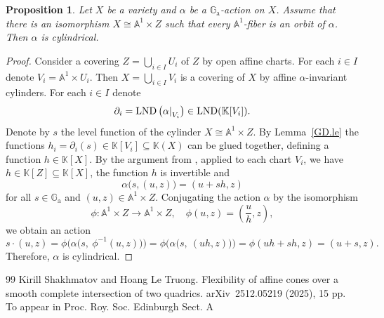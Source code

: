 \documentclass[10pt,a4paper]{amsart}
\newtheorem{prop}{Proposition}
\newcommand{\Ga}{\bb{G}_\mathrm{a}}
\DeclareMathOperator{\LND}{LND}
\newcommand{\bb}{\mathbb}
\newcommand{\der}{\partial}
\newcommand{\restrict}[2]{
    \left.
    \kern-\nulldelimiterspace{#1}
    \right|_{#2}
}
\begin{document}
\begin{prop} \label{CGA.pr}
Let $X$ be a variety and $\alpha$ be a $\Ga$-action on $X$. Assume that there is an isomorphism $X \cong \bb{A}^1 \times Z$ such that every $\bb{A}^1$-fiber is an orbit of $\alpha$. Then $\alpha$ is cylindrical.
\end{prop}

\begin{proof}
Consider a covering $Z = \bigcup_{i \in I} U_i$ of $Z$ by open affine charts. For each $i \in I$ denote $V_i = \bb{A}^1 \times U_i$. Then $X = \bigcup_{i \in I} V_i$ is a covering of $X$ by affine $\alpha$-invariant cylinders. For each $i \in I$ denote
$$
\der_i =
\LND \left( \restrict{\alpha}{V_i} \right) \in
\LND(\bb{K}[V_i]).
$$
Denote by $s$ the level function of the cylinder $X \cong \bb{A}^1 \times Z$. By Lemma~\ref{GD.le} the functions $h_i = \der_i(s) \in \bb{K}[V_i] \subseteq \bb{K}(X)$ can be glued together, defining a function $h \in \bb{K}[X]$. By the argument from \cite[Lemma~2.3]{ST25}, applied to each chart $V_i$, we have $h \in \bb{K}[Z] \subseteq \bb{K}[X]$, the function $h$ is invertible and
$$
\alpha \big( s, (u, z) \big) = (u + s h, z)
$$
for all $s \in \Ga$ and $(u, z) \in \bb{A}^1 \times Z$. Conjugating the action $\alpha$ by the isomorphism
$$
\phi \colon \bb{A}^1 \times Z \to \bb{A}^1 \times Z, \quad
\phi(u, z) = \left( \frac{u}{h}, z \right),
$$
we obtain an action
$$
s \cdot (u, z) =
\phi \Big( \alpha \big( s, \ \phi^{-1}(u, z) \big) \Big) =
\phi \Big( \alpha \big( s, \ (u h, z) \big) \Big) =
\phi(u h + s h, z) = (u + s, z).
$$
Therefore, $\alpha$ is cylindrical.
\end{proof}

\begin{thebibliography}{99}
 Kirill Shakhmatov and Hoang Le Truong. Flexibility of affine cones over a smooth complete intersection of two quadrics. arXiv~2512.05219 (2025), 15 pp. To appear in Proc. Roy. Soc. Edinburgh Sect. A
\end{thebibliography}
\end{document}
